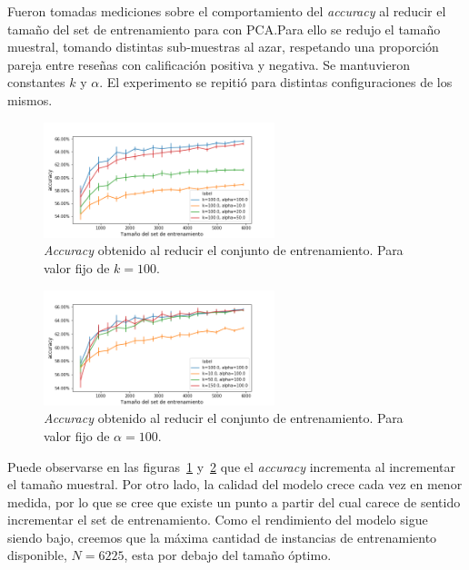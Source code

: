 % 

%
Fueron tomadas mediciones sobre el comportamiento del \textit{accuracy} al
reducir el tamaño del set de entrenamiento para \knn{} con PCA.\@ Para ello se
redujo el tamaño muestral, tomando distintas sub-muestras al azar, respetando
una proporción pareja entre reseñas con calificación positiva y negativa.
Se mantuvieron constantes $k$ y $\alpha$. El experimento se repitió para
distintas configuraciones de los mismos.

\begin{figure}[ht]
    \centering
    \includegraphics[width=0.6\textwidth]{img/exp_subsampling_k_fijo}
    \caption{\textit{Accuracy} obtenido al reducir el conjunto de
    entrenamiento.  Para valor fijo de $k=100$.}%
    \label{fig:subsampling_k_fijo}
\end{figure}

\begin{figure}[ht]
    \centering
    \includegraphics[width=0.6\textwidth]{img/exp_subsampling_alpha_fijo}
    \caption{\textit{Accuracy} obtenido al reducir el conjunto de
    entrenamiento.  Para valor fijo de $\alpha=100$.}%
    \label{fig:subsampling_alpha_fijo}
\end{figure}

%
Puede observarse en las figuras~\ref{fig:subsampling_k_fijo}
y~\ref{fig:subsampling_alpha_fijo} que el \textit{accuracy} incrementa al
incrementar el tamaño muestral.  Por otro lado, la calidad del modelo crece
cada vez en menor medida, por lo que se cree que existe un punto a partir del
cual carece de sentido incrementar el set de entrenamiento. Como el rendimiento
del modelo sigue siendo bajo, creemos que la máxima cantidad de instancias de
entrenamiento disponible, $N = 6225$, esta por debajo del tamaño óptimo.

